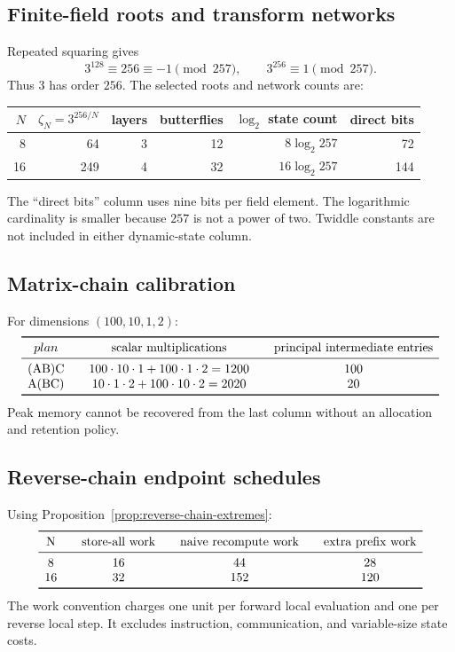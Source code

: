 \subsection{Finite-field roots and transform networks}

Repeated squaring gives
\[
  3^{128}\equiv256\equiv-1\pmod{257},
  \qquad 3^{256}\equiv1\pmod{257}.
\]
Thus $3$ has order $256$.  The selected roots and network counts are:

\begin{center}
\begin{tabular}{rrrrrr}
\toprule
$N$ & $\zeta_N=3^{256/N}$ & layers & butterflies & $\log_2$ state count & direct bits\\
\midrule
8  &64  &3&12&$8\log_2 257$&72\\
16 &249 &4&32&$16\log_2 257$&144\\
\bottomrule
\end{tabular}
\end{center}

The ``direct bits'' column uses nine bits per field element.  The logarithmic
cardinality is smaller because $257$ is not a power of two.  Twiddle constants
are not included in either dynamic-state column.

\subsection{Matrix-chain calibration}

For dimensions $(100,10,1,2)$:
\[
\begin{array}{c@{\qquad}c@{\qquad}c}
\toprule
plan & \text{scalar multiplications} & \text{principal intermediate entries}\\
\midrule
$(AB)C$ &100\cdot10\cdot1+100\cdot1\cdot2=1200&100\\
$A(BC)$ &10\cdot1\cdot2+100\cdot10\cdot2=2020&20\\
\bottomrule
\end{array}
\]
Peak memory cannot be recovered from the last column without an allocation and
retention policy.

\subsection{Reverse-chain endpoint schedules}

Using Proposition~\ref{prop:reverse-chain-extremes}:
\[
\begin{array}{c@{\qquad}c@{\qquad}c@{\qquad}c}
\toprule
$N$ & \text{store-all work} & \text{naive recompute work} & \text{extra prefix work}\\
\midrule
8  &16&44&28\\
16 &32&152&120\\
\bottomrule
\end{array}
\]
The work convention charges one unit per forward local evaluation and one per
reverse local step.  It excludes instruction, communication, and variable-size
state costs.
